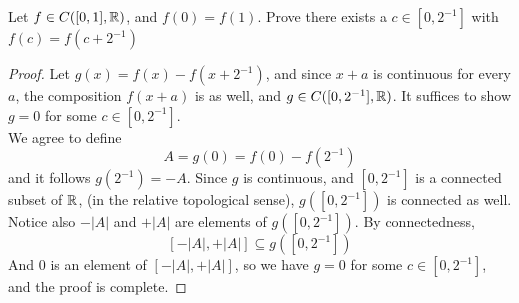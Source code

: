 \documentclass[../main.tex]{subfiles}
\begin{document}
\begin{wts}
    Let $f\in C([0,1],\mathbb{R})$, and $f(0)=f(1)$. Prove there exists a $c\in[0,2^{-1}]$ with $f(c)=f(c+2^{-1})$
\end{wts}
\begin{proof}
    Let $g(x)=f(x)-f(x+2^{-1})$, and since $x+a$ is continuous for every $a$, the composition $f(x+a)$ is as well, and $g\in C([0,2^{-1}],\mathbb{R})$. It suffices to show $g=0$ for some $c\in[0,2^{-1}]$.\\
    
    We agree to define \[A=g(0)=f(0)-f(2^{-1})\]
    and it follows $g(2^{-1})=-A$. Since $g$ is continuous, and $[0,2^{-1}]$ is a connected subset of $\mathbb{R}$, (in the relative topological sense), $g([0,2^{-1}])$ is connected as well.\\
    
    Notice also $-|A|$ and $+|A|$ are elements of $g([0,2^{-1}])$. By connectedness, \[[-|A|,+|A|]\subseteq g([0,2^{-1}])\] 
    And $0$ is an element of $[-|A|,+|A|]$, so we have $g=0$ for some $c\in [0,2^{-1}]$, and the proof is complete.
\end{proof}
\end{document}
